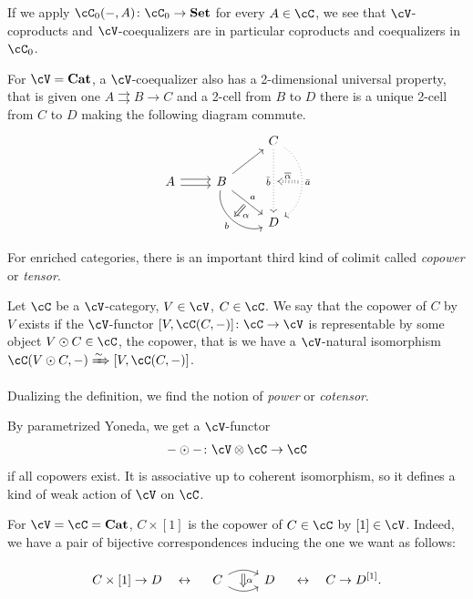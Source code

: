 \documentclass[a4paper,11pt,oneside,openany]{scrbook}
\begin{document}
\begin{rmk}
	If we apply $\cC_0(-,A)\colon\cC_0\rightarrow\Set$ for every $A\in\cC$, we
    see that $\cV$-coproducts and $\cV$-coequalizers are in particular
    coproducts and coequalizers in $\cC_0$.
\end{rmk}

\begin{exmp}
	For $\cV=\Cat$, a $\cV$-coequalizer also has a 2-dimensional universal property, that is given one $A\rightrightarrows B\rightarrow C$ and a 2-cell from $B$ to $D$ there is a unique 2-cell from $C$ to $D$ making the following diagram commute.
	\[
		\begin{tikzcd}
			&& C\ar[dd, dotted, swap, "\bar{b}", ""{name=bbar}]\ar[dd, dotted, bend left=60, "\bar{a}", ""{name=abar}] \\
			A\ar[r, shift left,]\ar[r, shift right]
			& B\ar[ur]\ar[dr, "a", ""{name=a}]\ar[dr, bend right=60, swap, "b", ""{name=b}] \\
			&& D
			\ar[Rightarrow, shorten <= .3em, shorten >= .3em, from=a, to=b, "\alpha"]
			\ar[Rightarrow, dotted, shorten <= .3em, shorten >= .3em, swap, from=abar, to=bbar, "\overline{\alpha}"]
		\end{tikzcd}
	\]
\end{exmp}

For enriched categories, there is an important third kind of colimit called \emph{copower} or \emph{tensor}.

\begin{defn}
	Let $\cC$ be a $\cV$-category, $V\in\cV$, $C\in\cC$. We say that the copower of $C$ by $V$ exists if the $\cV$-functor $[V,\cC(C,-)]\colon\cC\rightarrow\cV$ is representable by some object $V\odot C\in\cC$, the copower, that is we have a $\cV$-natural isomorphism $\cC(V\odot C,-)\xRightarrow{\sim}[V,\cC(C,-)]$.

	Dualizing the definition, we find the notion of \emph{power} or \emph{cotensor}.
\end{defn}

\begin{rmk}
	By parametrized Yoneda, we get a $\cV$-functor$$-\odot-\colon\cV\otimes\cC\rightarrow\cC$$if all copowers exist. It is associative up to coherent isomorphism, so it defines a kind of weak action of $\cV$ on $\cC$.
\end{rmk}

\begin{exmp}
	For $\cV=\cC=\Cat$, $C\times[1]$ is the copower of $C\in\cC$ by $[1]\in\cV$. Indeed, we have a pair of bijective correspondences inducing the one we want as follows:

	$$C\times[1]\rightarrow D\quad\leftrightarrow\quad
		\begin{tikzcd}
			C\ar[r, bend left, ""{name=A}]\ar[r, bend right, swap, ""{name=B}]
			& D
			\ar[Rightarrow, shorten <= .3em, shorten >= .3em, from=A, to=B, "\alpha"]
		\end{tikzcd}
		\quad\leftrightarrow\quad C\rightarrow D^{[1]}.$$
\end{exmp}
\end{document}
